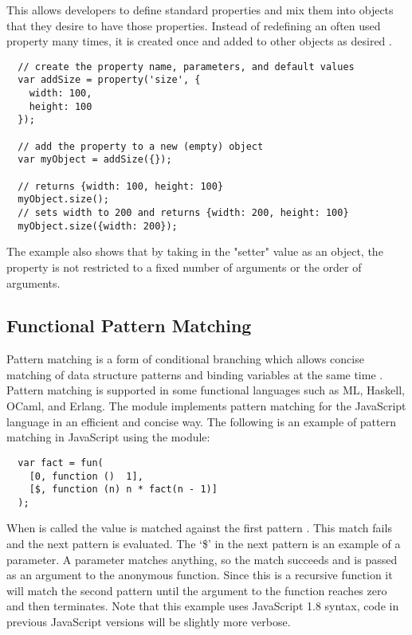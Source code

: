 This allows developers to define standard properties and mix them into objects that they desire to have those properties. Instead of redefining an often used property many times, it is created once and added to other objects as desired \cite{crockford08}.
\begin{verbatim}
  // create the property name, parameters, and default values
  var addSize = property('size', {
    width: 100,
    height: 100
  });

  // add the property to a new (empty) object
  var myObject = addSize({});

  // returns {width: 100, height: 100}
  myObject.size(); 
  // sets width to 200 and returns {width: 200, height: 100}
  myObject.size({width: 200});
\end{verbatim}
The example also shows that by taking in the "setter" value as an object, the property is not restricted to a fixed number of arguments or the order of arguments.

\subsection{Functional Pattern Matching}
Pattern matching is a form of conditional branching which allows concise matching of data structure patterns and binding variables at the same time \cite{wikipedia09}. Pattern matching is supported in some functional languages such as ML, Haskell, OCaml, and Erlang. The  module implements pattern matching for the JavaScript language in an efficient and concise way. The following is an example of pattern matching in JavaScript using the  module:
\begin{verbatim}
  var fact = fun(
    [0, function ()  1],
    [$, function (n) n * fact(n - 1)]
  );
\end{verbatim}
When  is called the value  is matched against the first pattern . This match fails and the next pattern is evaluated. The ‘\$’ in the next pattern is an example of a parameter. A parameter matches anything, so the match succeeds and  is passed as an argument to the anonymous function. Since this is a recursive function it will match the second pattern until the argument to the function reaches zero and then terminates. Note that this example uses JavaScript 1.8 syntax, code in previous JavaScript versions will be slightly more verbose.

